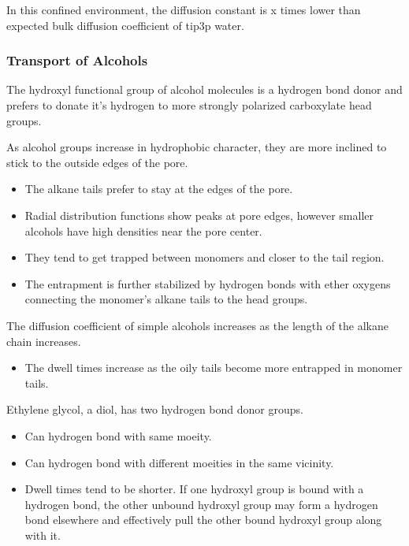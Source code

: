 \documentclass{article}
\begin{document}
  In this confined environment, the diffusion constant is x times lower than
  expected bulk diffusion coefficient of tip3p water.

  
  \subsubsection*{Transport of Alcohols}

  The hydroxyl functional group of alcohol molecules is a hydrogen bond donor
  and prefers to donate it's hydrogen to more strongly polarized carboxylate head
  groups.

  As alcohol groups increase in hydrophobic character, they are more inclined
  to stick to the outside edges of the pore. 
  \begin{itemize}
	\item The alkane tails prefer to stay at the edges of the pore.
	\item Radial distribution functions show peaks at pore edges, however
	smaller alcohols have high densities near the pore center. 
	\item They tend to get trapped between monomers and closer to 
	the tail region. 
	\item The entrapment is further stabilized by hydrogen bonds with
	ether oxygens connecting the monomer's alkane tails to the head groups.
  \end{itemize}

  The diffusion coefficient of simple alcohols increases as the length of 
  the alkane chain increases.
  \begin{itemize}
	\item The dwell times increase as the oily tails become more
	entrapped in monomer tails.
  \end{itemize}

  Ethylene glycol, a diol, has two hydrogen bond donor groups.
  \begin{itemize}
	\item Can hydrogen bond with same moeity.
	\item Can hydrogen bond with different moeities in the same 
	vicinity. 
	\item Dwell times tend to be shorter. If one hydroxyl group is bound
	with a hydrogen bond, the other unbound hydroxyl group may form a hydrogen bond
	elsewhere and effectively pull the other bound hydroxyl group along with it. 
  \end{itemize}
\end{document}
